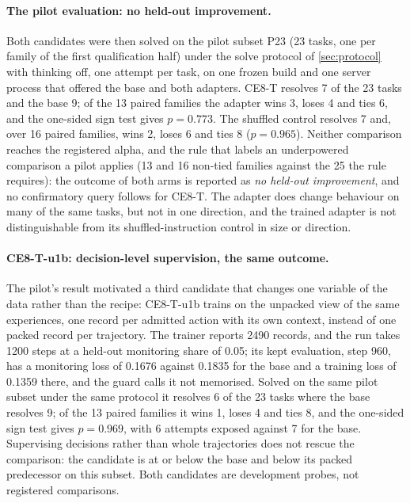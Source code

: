\paragraph{The pilot evaluation: no held-out improvement.} Both candidates were then solved on the pilot subset P23 (23 tasks, one per family of the first
qualification half) under the solve protocol of \cref{sec:protocol} with thinking off, one attempt per task,
on one frozen build and one server process that offered the base and both adapters. CE8-T resolves 7 of the
23 tasks and the base 9; of the 13 paired families the adapter wins 3, loses 4 and ties 6, and the one-sided
sign test gives $p=0.773$. The shuffled control resolves 7 and, over 16 paired families, wins 2,
loses 6 and ties 8 ($p=0.965$). Neither comparison reaches the registered alpha, and the rule
that labels an underpowered comparison a pilot applies (13 and 16 non-tied families against the 25 the rule
requires): the outcome of both arms is reported as \emph{no held-out improvement}, and no confirmatory query
follows for CE8-T. The adapter does change behaviour on many of the same tasks, but not in one direction, and
the trained adapter is not distinguishable from its shuffled-instruction control in size or direction.

\paragraph{CE8-T-u1b: decision-level supervision, the same outcome.} The pilot's result motivated a third
candidate that changes one variable of the data rather than the recipe: CE8-T-u1b trains on the unpacked
 view of the same experiences, one record per admitted action with its own context, instead of
one packed record per trajectory. The trainer reports 2490 records, and the run takes 1200 steps at a held-out
monitoring share of 0.05; its kept evaluation, step 960, has a monitoring loss of 0.1676 against 0.1835 for
the base and a training loss of 0.1359 there, and the guard calls it not memorised. Solved on the same
pilot subset under the same protocol it resolves 6 of the 23 tasks where the base resolves 9; of the 13 paired
families it wins 1, loses 4 and ties 8, and the one-sided sign test gives $p=0.969$, with 6 attempts exposed
against 7 for the base. Supervising decisions rather than whole trajectories does not rescue the
comparison: the candidate is at or below the base and below its packed predecessor on this subset. Both
candidates are development probes, not registered comparisons.

